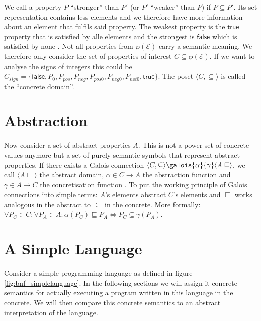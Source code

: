 \noindent We call a property $P$ ``stronger'' than $P'$ (or $P'$ ``weaker'' than $P$) if $P\subseteq P'$. Its set representation contains less elements and we therefore have more information about an element that fulfils said property. The weakest property is the $\mathsf{true}$ property that is satisfied by alle elements and the strongest is $\mathsf{false}$ which is satisfied by none \cite[chapter 8]{cousot2021}. Not all properties from $\wp(\mathcal{E})$ carry a semantic meaning. We therefore only consider the set of properties of interest $C\subseteq\wp(\mathcal{E})$. If we want to analyse the signs of integers this could be $C_{sign}=\{\mathsf{false}, P_{0}, P_{pos}, P_{neg}, P_{pos0}, P_{neg0}, P_{not0}, \mathsf{true}\}$. The poset  $\langle C,\subseteq\rangle$ is called the ``concrete domain''.

\section{Abstraction}\label{sec:abstraction}

Now consider a set of abstract properties $A$. This is not a power set of concrete values anymore but a set of purely semantic symbols that represent abstract properties. If there exists a Galois connection $\langle C,\subseteq\rangle \galois{\alpha}{\gamma}\langle A\sqsubseteq\rangle$, we call $\langle A\sqsubseteq\rangle$ the abstract domain, $\alpha\in C\to A$ the abstraction function and $\gamma\in A\to C$ the concretisation function \cite[chapter 11]{cousot2021}. To put the working principle of Galois connections into simple terms: $A$'s elements abstract $C$'s elements and $\sqsubseteq$ works analogous in the abstract to $\subseteq$ in the concrete. More formally: $\forall P_C\in C:\forall P_A \in A:\alpha(P_C)\sqsubseteq P_A \Longleftrightarrow P_C \subseteq \gamma(P_A)$.



\section{A Simple Language}

Consider a simple programming language as defined in figure \ref{fig:bnf_simplelanguage}. In the following sections we will assign it concrete semantics for actually executing a program written in this language in the concrete. We will then compare this concrete semantics to an abstract interpretation of the language.



